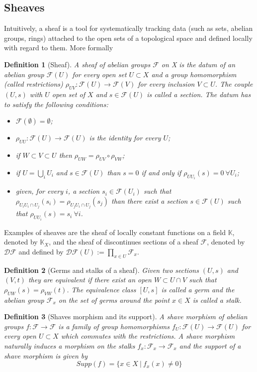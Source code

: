 \documentclass[a4paper,12pt]{article}
\newtheorem{Definition}{Definition}[section]
\begin{document}
\subsection{Sheaves}
Intuitively, a sheaf is a tool for systematically tracking data (such as sets, abelian groups, rings) attached to the open sets of a topological space and defined locally with regard to them. More formally
\begin{Definition}[Sheaf]
A sheaf of abelian groups $\mathcal{F}$ on X is the datum of an abelian group $\mathcal{F}(U)$ for every open set $U \subset X$ and a group homomorphism (called restrictions) $\rho_{UV}: \mathcal{F}(U) \rightarrow \mathcal{F}(V)$ for every inclusion $V \subset U$. The couple $(U,s)$ with $U$ open set of $X$ and $s \in \mathcal{F}(U)$ is called a section. The datum has to satisfy the following conditions:
\begin{itemize}
    \item $\mathcal{F}(\emptyset)=\emptyset$;
    \item $\rho_{UU}: \mathcal{F}(U) \rightarrow \mathcal{F}(U)$ is the identity for every $U$;
    \item if $W \subset V \subset U$ then $\rho_{UW}=\rho_{UV} \circ \rho_{VW}$;
    \item if $U=\bigcup_i U_i$ and $s \in \mathcal{F}(U)$ than $s=0$ if and only if $\rho_{UU_i}(s)=0 \  \forall U_i$; 
    \item given, for every $i$, a section $s_i \in \mathcal{F}(U_i)$ such that $\rho_{U_iU_i \cap U_j}(s_i)=\rho_{U_jU_i \cap U_j}(s_j)$ than there exist a section $s \in \mathcal{F}(U)$ such that $\rho_{UU_i}(s)=s_i \ \forall i$.
\end{itemize}
\end{Definition}
Examples of sheaves are the sheaf of locally constant functions on a field $\mathbb{K}$, denoted by $\mathbb{K}_X$, and the sheaf of discontinues sections of a sheaf $\mathcal{F}$, denoted by $\mathcal{DF}$ and defined by $\mathcal{DF}(U):=\prod_{x \in U} \mathcal{F}_x$.
\begin{Definition}[Germs and stalks of a sheaf]
    Given two sections $(U,s)$ and $(V,t)$ they are equivalent if there exist an open $W\subset U \cap V$ such that $\rho_{UW}(s)=\rho_{VW}(t)$. The equivalence class $[U,s]$ is called a germ and the abelian group $\mathcal{F}_x$ on the set of germs around the point $x \in X$ is called a stalk.
\end{Definition}

\begin{Definition}[Shaves morphism and its support]
    A  shave morphism of abelian groups $f:\mathcal{F} \rightarrow \mathcal{F}$ is a family of group homomorphisms $f_U : \mathcal{F}(U) \rightarrow \mathcal{F}(U)$ for every open $U \subset X$ which commutes with the restrictions. A  shave morphism naturally induces a morphism on the stalks $f_x : \mathcal{F}_x \rightarrow \mathcal{F}_x $ and the support of a shave morphism is given by 
    \begin{equation}
        Supp(f)=\{x \in X \ | \  f_x(x) \neq 0\}
    \end{equation}
\end{Definition}
\end{document}
